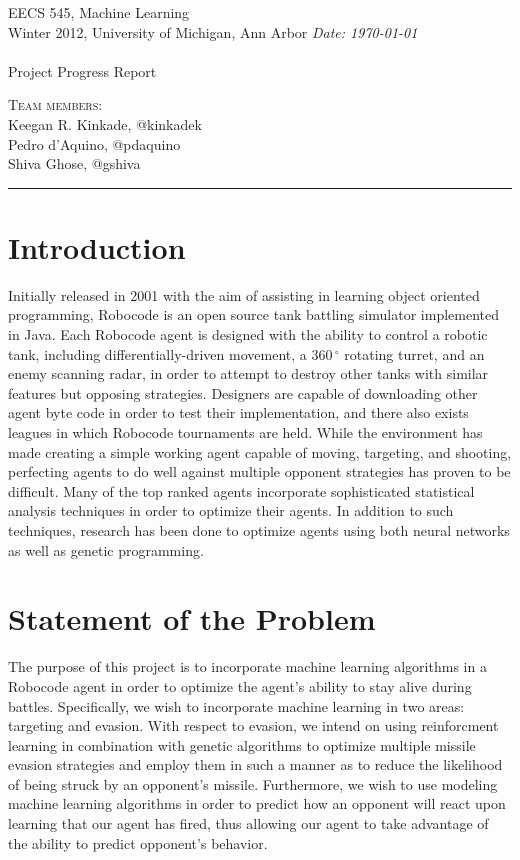 \documentclass{article}
\newcommand{\shortbar}{\begin{center}\rule{5ex}{0.1pt}\end{center}}
\newcommand{\courseNumber}{EECS 545}
\newcommand{\courseTitle}{Machine Learning}
\newcommand{\semester}{Winter 2012}
\theoremstyle{plain}
\theoremstyle{definition}
\theoremstyle{remark}
\newenvironment{solution}[1]{\medskip\noindent{\bf Problem #1.~}}{\shortbar}
\newcommand{\solutions}[4]{
\vspace{-2ex}
\begin{center}
{\small  \courseNumber, \courseTitle
\hfill {\Large \bf {#1} }\\
\semester, University of Michigan, Ann Arbor \hfill
{\em Date: #3}}\\
\vspace{-1ex}
\hrulefill\\
\vspace{4ex}
{\LARGE Project Progress Report #2}\\
\vspace{2ex}
\end{center}
\begin{trivlist}
\item \textsc{Team members:} {#4}
\end{trivlist}
\noindent
\shortbar
\vspace{3ex}
}
\begin{document}
\solutions{}{}{\today}{\\ Keegan R. Kinkade, @kinkadek\\ Pedro d'Aquino, @pdaquino \\Shiva Ghose, @gshiva }
%
%

\section*{Introduction}

Initially released in 2001 with the aim of assisting in learning object oriented programming, Robocode is an open source tank battling simulator implemented in Java. Each Robocode agent is designed with the ability to control a robotic tank, including differentially-driven movement, a $360\,^{\circ}\mathrm{}$ rotating turret, and an enemy scanning radar, in order to attempt to destroy other tanks with similar features but opposing strategies. Designers are capable of downloading other agent byte code in order to test their implementation, and there also exists leagues in which Robocode tournaments are held. While the environment has made creating a simple working agent capable of moving, targeting, and shooting, perfecting agents to do well against multiple opponent strategies has proven to be difficult. Many of the top ranked agents incorporate sophisticated statistical analysis techniques in order to optimize their agents. In addition to such techniques, research has been done to optimize agents using both neural networks as well as genetic programming.

\section*{Statement of the Problem}

The purpose of this project is to incorporate machine learning algorithms in a Robocode agent in order to optimize the agent's ability to stay alive during battles. Specifically, we wish to incorporate machine learning in two areas: targeting and evasion. With respect to evasion, we intend on using reinforcment learning in combination with genetic algorithms to optimize multiple missile evasion strategies and employ them in such a manner as to reduce the likelihood of being struck by an opponent's missile. Furthermore, we wish to use modeling machine learning algorithms in order to predict how an opponent will react upon learning that our agent has fired, thus allowing our agent to take advantage of the ability to predict opponent's behavior. 
\end{document}
